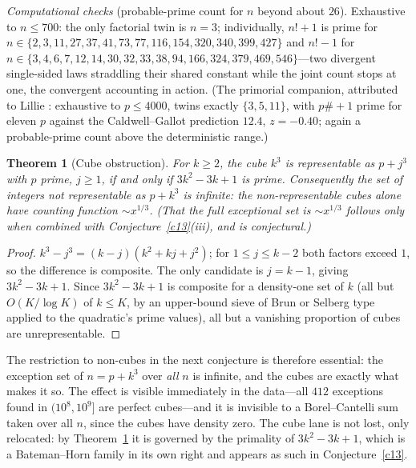 \documentclass[11pt]{article}
\newtheorem{theorem}{Theorem}
\theoremstyle{definition}
\begin{document}
\emph{Computational checks} (probable-prime count for $n$ beyond about $26$).
Exhaustive to $n\le700$: the only factorial twin is
$n=3$; individually, $n!+1$ is prime for
$n\in\{2,3,11,27,37,41,73,77,116,154,320,340,399,427\}$ and $n!-1$
for $n\in\{3,4,6,7,12,14,30,32,33,38,94,166,324,379,469,546\}$---two
divergent single-sided laws straddling their shared constant while
the joint count stops at one, the convergent accounting in action.
(The primorial companion, attributed to Lillie \cite{Lillie}:
exhaustive to $p\le4000$, twins exactly
$\{3,5,11\}$, with $p\#+1$ prime for eleven $p$ against the
Caldwell--Gallot prediction $12.4$, $z=-0.40$; again a probable-prime
count above the deterministic range.)

\begin{theorem}[Cube obstruction]\label{t:cube}
For $k\ge2$, the cube $k^3$ is representable as $p+j^3$ with $p$ prime,
$j\ge1$, if and only if $3k^2-3k+1$ is prime.  Consequently the set of
integers not representable as $p+k^3$ is infinite: the non-representable
\emph{cubes} alone have counting function $\sim x^{1/3}$.  (That the
full exceptional set is $\sim x^{1/3}$ follows only when combined with
Conjecture~\ref{c13}(iii), and is conjectural.)
\end{theorem}

\begin{proof}
$k^3-j^3=(k-j)(k^2+kj+j^2)$; for $1\le j\le k-2$ both factors exceed
$1$, so the difference is composite.  The only candidate is $j=k-1$,
giving $3k^2-3k+1$.  Since $3k^2-3k+1$ is composite for a density-one
set of $k$ (all but $O(K/\log K)$ of $k\le K$, by an upper-bound sieve
of Brun or Selberg type applied to the quadratic's prime values), all
but a vanishing proportion of cubes are unrepresentable.
\end{proof}

The restriction to non-cubes in the next conjecture is therefore essential:
the exception set of $n=p+k^3$ over
\emph{all} $n$ is infinite, and the cubes are exactly what makes it so.
The effect is visible immediately in the data---all $412$ exceptions
found in $(10^8,10^9]$ are perfect cubes---and it is invisible to a
Borel--Cantelli sum taken over all $n$, since the cubes have density
zero.  The cube lane is not lost, only relocated: by
Theorem~\ref{t:cube} it is governed by the primality of $3k^2-3k+1$,
which is a Bateman--Horn family in its own right and appears as such in
Conjecture~\ref{c13}.
\end{document}
